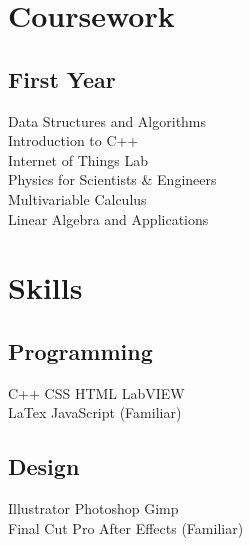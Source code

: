 \documentclass[letterpaper]{deedy-resume} %
\begin{document}
\begin{minipage}[t]{0.33\textwidth}
\sectionspace %


\section{Coursework}

\subsection{First Year}

Data Structures and Algorithms \\
Introduction to C++ \\
Internet of Things Lab\\
Physics for Scientists \& Engineers\\
Multivariable Calculus \\
Linear Algebra and Applications \\

\sectionspace %


\section{Skills}

\subsection{Programming}

C++ \textbullet{} CSS \textbullet{} HTML \textbullet{} LabVIEW \\
LaTex \textbullet{} JavaScript (Familiar) \\

\sectionspace %

\subsection{Design}
Illustrator \textbullet{} Photoshop \textbullet{} Gimp \\
Final Cut Pro \textbullet{} After Effects (Familiar) \\

\sectionspace %


\end{minipage}
\end{document}
